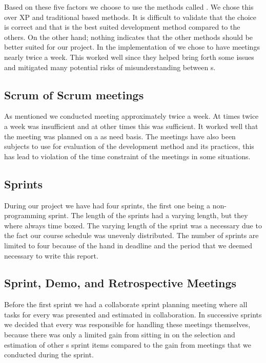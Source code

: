 Based on these five factors we choose to use the \scrum{} methods called \sos{}.  
We chose this over XP and traditional based methods.
It is difficult to validate that the choice is correct and that \sos{} is the best suited development method compared to the others.
On the other hand; nothing indicates that the other methods should be better suited for our project. 
In the implementation of \sos{} we chose to have \sos{} meetings nearly twice a week.
This worked well since they helped bring forth some issues and mitigated many potential risks of misunderstanding between \subgroup{}s.



\subsection{Scrum of Scrum meetings}
As mentioned we conducted \sos{} meeting approximately twice a week. 
At times twice a week was insufficient and at other times this was sufficient.
It worked well that the meeting was planned on a as need basis.
The \sos{} meetings have also been subjects to use for evaluation of the development method and its practices, this has lead to violation of the time constraint of the \sos{} meetings in some situations.


\subsection{Sprints}
During our project we have had four sprints, the first one being a non-programming sprint.
The length of the sprints had a varying length, but they where always time boxed. 
The varying length of the sprint was a necessary due to the fact our course schedule was unevenly distributed. 
The number of sprints are limited to four because of the hand in deadline and the period that we deemed necessary to write this report.




\subsection{Sprint, Demo, and Retrospective Meetings}
Before the first sprint we had a collaborate sprint planning meeting where all tasks for every \subgroup{} was presented and estimated in collaboration.
In successive sprints we decided that every \subgroup{} was responsible for handling these meetings themselves, because there was only a limited gain from sitting in on the selection and estimation of other \subgroup{}s sprint items compared to the gain from \sos{} meetings that we conducted during the sprint.

